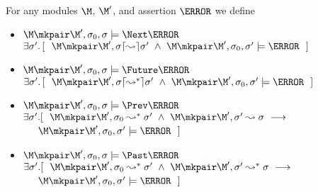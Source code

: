 \begin{definition}  \label{def:valid:assertion:time}
For any modules $\M$, $\M'$, and assertion  $\A$ we define
\begin{itemize}
 \item
  $\M\mkpair \M', \sigma_0 , \sigma \models  \Next \A $
  \IFF
  $\exists \sigma'.\, [\ \ \M\mkpair \M',\sigma \lceil\leadsto\rceil \sigma' \ \wedge\ \M\mkpair \M',\sigma_0 , \sigma' \models \A \ \  ]$
  \item
  $\M\mkpair \M', \sigma_0 , \sigma \models  \Future \A $
  \ \IFF
  $\exists \sigma'.\, [\ \ \M\mkpair \M',\sigma \lceil\leadsto^*\rceil \sigma' \ \wedge\ \M\mkpair \M',\sigma_0 , \sigma' \models \A \ \  ]$
  \item
 $\M\mkpair \M', \sigma_0 , \sigma \models  \Prev \A $\IFF
$\exists \sigma'. [\ \  \M\mkpair \M',\sigma_0 \leadsto^* \sigma'\ \wedge\ \M\mkpair \M',\sigma' \leadsto \sigma\ \longrightarrow\ $\\
 $\strut ~ \hspace{0.1in} $   \hfill 
$ \M\mkpair \M', \sigma_0 , \sigma'  \models \A\ \ 
 ]$ 
 \item
 $\M\mkpair \M',\sigma_0 ,  \sigma \models  \Past \A $ \IFF
$\exists \sigma'. [\ \  \M\mkpair \M',\sigma_0 \leadsto^* \sigma'\ \wedge\ \M\mkpair \M',\sigma' \leadsto^* \sigma\ \longrightarrow\ $\\
 $\strut ~ \hspace{0.1in} $   \hfill   
 $\M\mkpair \M', \sigma_0 , \sigma'  \models \A\ \ 
 ]$ 
\end{itemize}
\end{definition}

%
 
